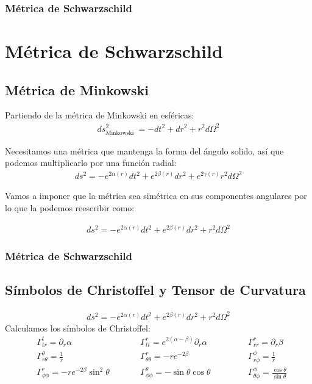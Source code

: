 \documentclass{beamer}
\begin{document}
\begin{frame}
\frametitle{Métrica de Schwarzschild}
\section{Métrica de Schwarzschild}
\subsection{Métrica de Minkowski}

Partiendo de la métrica de Minkowski en esféricas: 
\begin{gather*}
  ds^2 _{\text{Minkowski }}  = - dt^2 + dr^2 + r^2 d \Omega^2
\end{gather*}

Necesitamos una métrica que mantenga la forma del ángulo solido, así que podemos multiplicarlo por una función radial:
\begin{gather*}
  ds^2 = - e ^ {2 \alpha (r) } dt^2 + e ^ {2 \beta(r) } dr^2 + e ^ {2\gamma(r)}r^2 d \Omega^2 
\end{gather*}

Vamos a imponer que la métrica sea simétrica en sus componentes angulares por lo que la podemos reescribir como:

\begin{gather*}
  ds^2 = - e ^ {2\alpha(r)}dt^2 + e ^ {2 \beta (r) } dr^2 + r^2 d \Omega^2  
\end{gather*}

\end{frame}




\begin{frame}
\frametitle{Métrica de Schwarzschild}
\subsection{Símbolos de Christoffel y Tensor de Curvatura}

\begin{gather*}
  ds^2 = - e ^ {2\alpha(r)}dt^2 + e ^ {2 \beta (r) } dr^2 + r^2 d \Omega^2  
\end{gather*}
Calculamos los símbolos de Christoffel:
\begin{align*}
  &\Gamma_{t r}^t=\partial _r \alpha \qquad &&\Gamma_{t t}^r=e^{2(\alpha-\beta)} \partial_r \alpha \qquad &&&\Gamma_{r r}^{r}=\partial_r \beta \\
  &\Gamma_{r \theta}^\theta=\frac{1}{r} \qquad &&\Gamma_{\theta \theta}^r=-r e^{-2 \beta} \qquad &&&\Gamma_{r \phi}^\phi=\frac{1}{r} \\
  &\Gamma_{\phi \phi}^r=-r e^{-2 \beta} \sin ^2 \theta \qquad &&\Gamma_{\phi \phi}^\theta=-\sin \theta \cos \theta \qquad &&&\Gamma_{\theta \phi}^\phi=\frac{\cos \theta}{\sin \theta}
\end{align*}
\end{frame}
\end{document}
